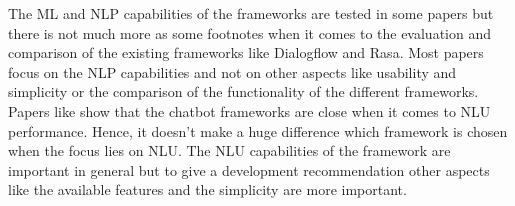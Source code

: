 The ML and NLP capabilities of the frameworks are tested in some papers but there is not much more as some footnotes when it 
comes to the evaluation and comparison of the existing frameworks like Dialogflow and Rasa.
Most papers focus on the NLP capabilities and not on other aspects like usability and simplicity or the comparison of the 
functionality of the different frameworks.
Papers like \citet{braunEvaluatingNLU} show that the chatbot frameworks are close when it comes to NLU performance.
Hence, it doesn't make a huge difference which framework is chosen when the focus lies on NLU.
The NLU capabilities of the framework are important in general but to give a development recommendation other aspects
like the available features and the simplicity are more important.



